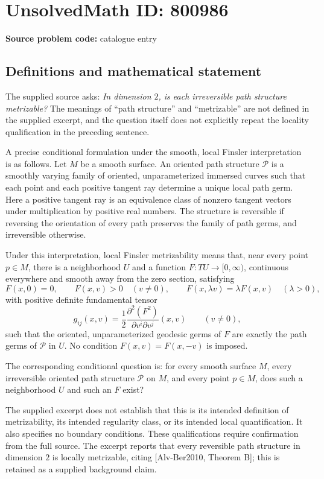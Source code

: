 \documentclass[11pt]{article}
\begin{document}
\section*{UnsolvedMath ID: 800986}
\textbf{Source problem code:} catalogue entry
\subsection{Definitions and mathematical statement}
The supplied source asks: \emph{In dimension \(2\), is each irreversible path structure metrizable?} The meanings of ``path structure'' and ``metrizable'' are not defined in the supplied excerpt, and the question itself does not explicitly repeat the locality qualification in the preceding sentence.

A precise conditional formulation under the smooth, local Finsler interpretation is as follows. Let \(M\) be a smooth surface. An oriented path structure \(\mathcal P\) is a smoothly varying family of oriented, unparameterized immersed curves such that each point and each positive tangent ray determine a unique local path germ. Here a positive tangent ray is an equivalence class of nonzero tangent vectors under multiplication by positive real numbers. The structure is reversible if reversing the orientation of every path preserves the family of path germs, and irreversible otherwise.

Under this interpretation, local Finsler metrizability means that, near every point \(p\in M\), there is a neighborhood \(U\) and a function \(F:TU\to[0,\infty)\), continuous everywhere and smooth away from the zero section, satisfying
\[
F(x,0)=0,\qquad F(x,v)>0\quad(v\ne0),\qquad F(x,\lambda v)=\lambda F(x,v)\quad(\lambda>0),
\]
with positive definite fundamental tensor
\[
g_{ij}(x,v)=\frac12\frac{\partial^2(F^2)}{\partial v^i\partial v^j}(x,v)\qquad(v\ne0),
\]
such that the oriented, unparameterized geodesic germs of \(F\) are exactly the path germs of \(\mathcal P\) in \(U\). No condition \(F(x,v)=F(x,-v)\) is imposed.

The corresponding conditional question is: for every smooth surface \(M\), every irreversible oriented path structure \(\mathcal P\) on \(M\), and every point \(p\in M\), does such a neighborhood \(U\) and such an \(F\) exist?

The supplied excerpt does not establish that this is its intended definition of metrizability, its intended regularity class, or its intended local quantification. It also specifies no boundary conditions. These qualifications require confirmation from the full source. The excerpt reports that every reversible path structure in dimension \(2\) is locally metrizable, citing [Alv-Ber2010, Theorem B]; this is retained as a supplied background claim.
\end{document}
